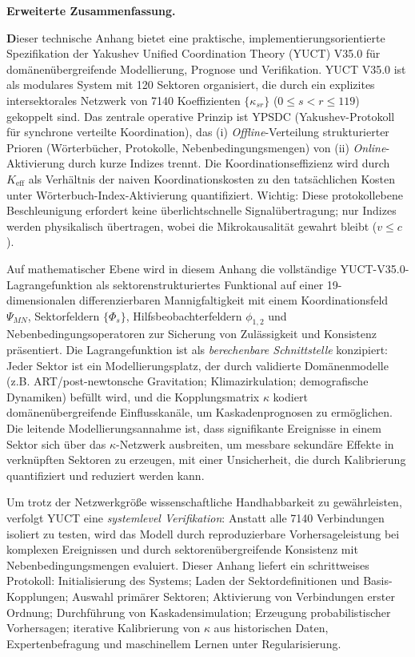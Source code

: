 \documentclass[13pt,a4paper]{article}
\newcommand{\Keff}{K_{\mathrm{eff}}}
\begin{document}
\begin{titlepage}
\begin{center}
			\begin{minipage}{0.92\textwidth}
				\begin{center}\large\textbf{Erweiterte Zusammenfassung.} \\
				\end{center}
				\large\textbf Dieser technische Anhang bietet eine praktische, implementierungsorientierte Spezifikation der Yakushev Unified Coordination Theory (YUCT) V35.0 für domänenübergreifende Modellierung, Prognose und Verifikation. YUCT V35.0 ist als modulares System mit 120 Sektoren organisiert, die durch ein explizites intersektorales Netzwerk von 7140 Koeffizienten $\{\kappa_{sr}\}$ ($0\le s<r\le 119$) gekoppelt sind. Das zentrale operative Prinzip ist YPSDC (Yakushev-Protokoll für synchrone verteilte Koordination), das (i) \emph{Offline}-Verteilung strukturierter Prioren (Wörterbücher, Protokolle, Nebenbedingungsmengen) von (ii) \emph{Online}-Aktivierung durch kurze Indizes trennt. Die Koordinationseffizienz wird durch $\Keff$ als Verhältnis der naiven Koordinationskosten zu den tatsächlichen Kosten unter Wörterbuch-Index-Aktivierung quantifiziert. Wichtig: Diese protokollebene Beschleunigung erfordert keine überlichtschnelle Signalübertragung; nur Indizes werden physikalisch übertragen, wobei die Mikrokausalität gewahrt bleibt ($v\le c$).
				
				Auf mathematischer Ebene wird in diesem Anhang die vollständige YUCT-V35.0-Lagrangefunktion als sektorenstrukturiertes Funktional auf einer 19-dimensionalen differenzierbaren Mannigfaltigkeit mit einem Koordinationsfeld $\Psi_{MN}$, Sektorfeldern $\{\Phi_s\}$, Hilfsbeobachterfeldern $\phi_{1,2}$ und Nebenbedingungsoperatoren zur Sicherung von Zulässigkeit und Konsistenz präsentiert. Die Lagrangefunktion ist als \emph{berechenbare Schnittstelle} konzipiert: Jeder Sektor ist ein Modellierungsplatz, der durch validierte Domänenmodelle (z.B. ART/post-newtonsche Gravitation; Klimazirkulation; demografische Dynamiken) befüllt wird, und die Kopplungsmatrix $\kappa$ kodiert domänenübergreifende Einflusskanäle, um Kaskadenprognosen zu ermöglichen. Die leitende Modellierungsannahme ist, dass signifikante Ereignisse in einem Sektor sich über das $\kappa$-Netzwerk ausbreiten, um messbare sekundäre Effekte in verknüpften Sektoren zu erzeugen, mit einer Unsicherheit, die durch Kalibrierung quantifiziert und reduziert werden kann.
				
				Um trotz der Netzwerkgröße wissenschaftliche Handhabbarkeit zu gewährleisten, verfolgt YUCT eine \emph{systemlevel Verifikation}: Anstatt alle 7140 Verbindungen isoliert zu testen, wird das Modell durch reproduzierbare Vorhersageleistung bei komplexen Ereignissen und durch sektorenübergreifende Konsistenz mit Nebenbedingungsmengen evaluiert. Dieser Anhang liefert ein schrittweises Protokoll: Initialisierung des Systems; Laden der Sektordefinitionen und Basis-Kopplungen; Auswahl primärer Sektoren; Aktivierung von Verbindungen erster Ordnung; Durchführung von Kaskadensimulation; Erzeugung probabilistischer Vorhersagen; iterative Kalibrierung von $\kappa$ aus historischen Daten, Expertenbefragung und maschinellem Lernen unter Regularisierung.
				

\end{minipage}
\end{center}
\end{titlepage}
\end{document}
